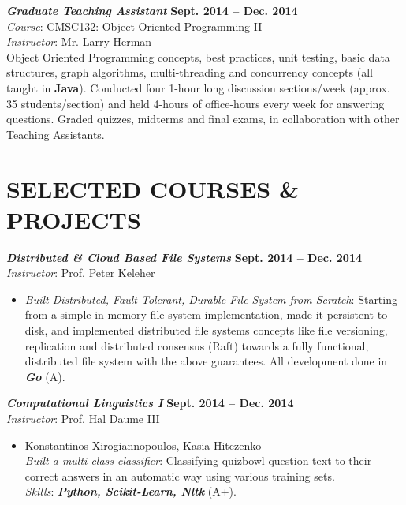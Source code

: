 \documentclass[margin, 10pt]{res} %
\begin{document}
\begin{resume}
{\sl \textbf{Graduate Teaching Assistant}} \hfill \textbf{Sept. 2014 -- Dec. 2014}\\
\textit{Course}: CMSC132: Object Oriented Programming II \\
\textit{Instructor}: Mr. Larry Herman\\
Object Oriented Programming concepts, best practices, unit testing, basic data structures, graph algorithms, multi-threading and concurrency concepts (all taught in \textbf{Java}). Conducted four 1-hour long discussion sections/week (approx. 35 students/section) and held 4-hours of office-hours every week for answering questions. Graded quizzes, midterms and final exams, in collaboration with other Teaching Assistants.



\section{SELECTED COURSES \& PROJECTS}

{\sl \textbf{Distributed \& Cloud Based File Systems}} \hfill \textbf{Sept. 2014 -- Dec. 2014}\\
\textit{Instructor}: Prof. Peter Keleher
\begin{itemize}
  \item \textit{Built Distributed, Fault Tolerant, Durable File System from Scratch}: Starting from a simple in-memory file system implementation, made it persistent to disk, and implemented distributed file systems concepts like file versioning, replication and distributed consensus (Raft) towards a fully functional, distributed file system with the above guarantees. All development done in \textbf{\textit{Go}} (A).
\end{itemize}


{\sl \textbf{Computational Linguistics I}} \hfill \textbf{Sept. 2014 -- Dec. 2014}\\
\textit{Instructor}: Prof. Hal Daume III
\begin{itemize}
  \item
  Konstantinos Xirogiannopoulos, Kasia Hitczenko\\
  \textit{Built a multi-class classifier}: Classifying quizbowl question text to their correct answers in an automatic way using various training sets.\\ \textit{Skills}: \textbf{\textit{Python, Scikit-Learn, Nltk}} (A+).
\end{itemize}


\end{resume}
\end{document}
